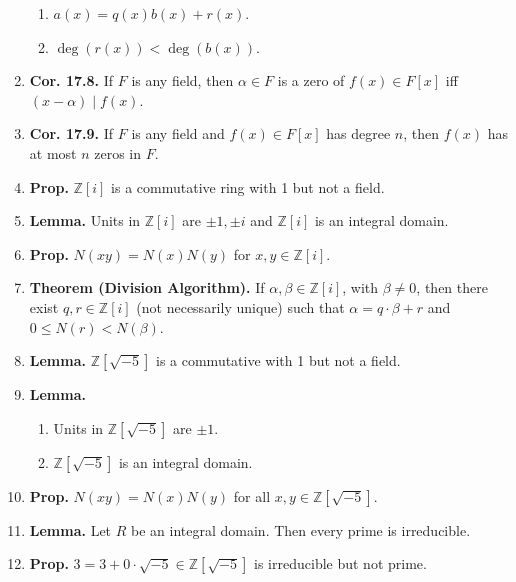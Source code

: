 \begin{enumerate}
	\begin{enumerate}
		\item $a(x) = q(x)b(x)+r(x)$. 
		\item $\deg(r(x)) < \deg(b(x))$. 
	\end{enumerate}
	\item \textbf{Cor. 17.8. } If $F$ is any field, then $\alpha \in F$ is a zero of $f(x) \in F[x]$ iff $(x-\alpha) \mid f(x)$. 
	\item \textbf{Cor. 17.9. } If $F$ is any field and $f(x) \in F[x]$ has degree $n$, then $f(x)$ has at most $n$ zeros in $F$. 
	\item \textbf{Prop. } $\mathbb{Z}[i]$ is a commutative ring with 1 but not a field. 	
	\item \textbf{Lemma. } Units in $\mathbb{Z}[i]$ are $\pm 1, \pm i$ and $\mathbb{Z}[i]$ is an integral domain. 	
	\item \textbf{Prop. } $N(xy)=N(x)N(y)$ for $x,y \in \mathbb{Z}[i]$. 
	\item \textbf{Theorem (Division Algorithm). } If $\alpha, \beta \in \mathbb{Z}[i]$, with $\beta \neq 0$, then there exist $q,r \in \mathbb{Z}[i]$ (not necessarily unique) such that $\alpha = q \cdot \beta + r$ and $0 \leq N(r) < N(\beta)$. 
	\item \textbf{Lemma. } $\mathbb{Z}[\sqrt{-5}]$ is a commutative with 1 but not a field. 
	\item \textbf{Lemma. } 
	\begin{enumerate}
		\item Units in $\mathbb{Z}[\sqrt{-5}]$ are $\pm 1$. 
		\item $\mathbb{Z}[\sqrt{-5}]$ is an integral domain. 
	\end{enumerate}
	\item \textbf{Prop. } $N(xy) = N(x)N(y)$ for all $x,y \in \mathbb{Z}[\sqrt{-5}]$. 
	\item \textbf{Lemma. } Let $R$ be an integral domain. Then every prime is irreducible. 
	\item \textbf{Prop. } $3 = 3 + 0 \cdot \sqrt{-5} \in \mathbb{Z}[\sqrt{-5}]$ is irreducible but not prime. 
\end{enumerate}


